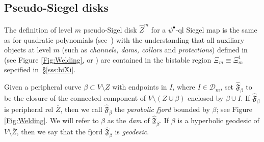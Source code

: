 \documentclass{amsart}
\newcommand{\1}{{\mathbb 1 }}
\newcommand{\wZ}{{\widehat Z}}
\theoremstyle{remark}
\numberwithin{equation}{section}
\theoremstyle{definition}
\begin{document}
\subsection{Pseudo-Siegel disks}\label{sss:iota peripheral}
The definition of level $m$ pseudo-Sigel disk $\wZ^m$ for a $\psi^\bullet$-ql Siegel map is the same as for quadratic polynomials (see~\cite[Definition 5.1]{DL22}) with the understanding that all auxiliary objects at level $m$ (such as {\em channels, dams, collars} and {\em protections}) defined in~\cite[\S~5.1]{DL22} (see Figure \ref{Fig:Welding}, or \cite[Figure~16]{DL22}) are contained in the bistable region $\Xi_m\equiv \Xi^1_m$ sepcified in~\S\ref{sss:biXi}.



Given a peripheral curve $\beta \subset V\setminus Z$ with endpoints in $I$, where $I\in \mathcal D_m$, set $\widehat{\mathfrak F}_\beta$ to be the closure of the connected component of $V\setminus (Z\cup \beta)$ enclosed by $\beta \cup I$. If $\widehat{\mathfrak F}_\beta$ is peripheral rel $\overline Z$, then we call $\widehat{\mathfrak F}_\beta$ the \emph{parabolic fjord} bounded by $\beta$; see Figure \ref{Fig:Welding}. We will refer to $\beta$ as the \emph{dam} of $\widehat{\mathfrak F}_\beta$. If $\beta$ is a hyperbolic geodesic of $V\setminus \overline Z$, then we say that the fjord $\widehat{\mathfrak F}_\beta$ is \emph{geodesic}. 
\end{document}
